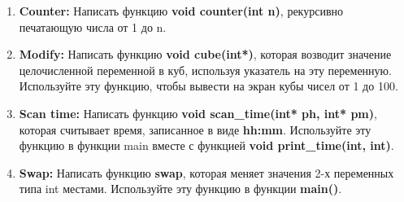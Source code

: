 \documentclass{article}
\begin{document}
\begin{enumerate}
\item \textbf{Counter:} Написать функцию \textbf{void counter(int n)}, рекурсивно печатающую числа от 1 до n.
\item \textbf{Modify:} Написать функцию \textbf{void cube(int*)}, которая возводит значение целочисленной переменной в куб, используя указатель на эту переменную. Используйте эту функцию, чтобы вывести на экран кубы чисел от 1 до 100.
\item \textbf{Scan time:} Написать функцию \textbf{void scan\_time(int* ph, int* pm)}, которая считывает время, записанное в виде \textbf{hh:mm}. Используйте эту функцию в функции main вместе с функцией \textbf{void print\_time(int, int)}.
\item \textbf{Swap:} Написать функцию \textbf{swap}, которая меняет значения 2-х переменных типа int местами. Используйте эту функцию в функции \textbf{main()}.



\end{enumerate}
\end{document}
